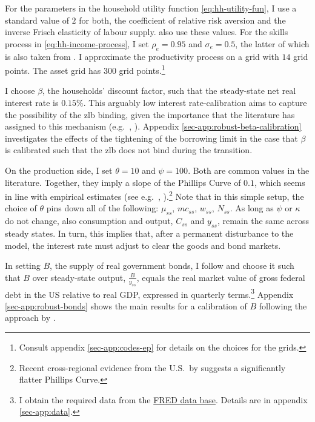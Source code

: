 \documentclass[12pt]{article} %
\numberwithin{equation}{section} %
\begin{document}
For the parameters in the household utility function \eqref{eq:hh-utility-fun}, I use a standard value of $2$ for both, the coefficient of relative risk aversion and the inverse Frisch elasticity of labour supply. \textcite{auclert2021} also use these values. For the skills process in \eqref{eq:hh-income-process}, I set $\rho_e = 0.95$ and $\sigma_e = 0.5$, the latter of which is also taken from \textcite{auclert2021}. I approximate the productivity process on a grid with $14$ grid points. The asset grid has $300$ grid points.\footnote{Consult appendix \ref{sec-app:codes-ep} for details on the choices for the grids.}

I choose $\beta$, the households' discount factor, such that the steady-state net real interest rate is $0.15\%$. This arguably low interest rate-calibration aims to capture the possibility of the \Gls{zlb} binding, given the importance that the literature has assigned to this mechanism (e.g.~\cite{egg2012}, \cite{gl2017}). Appendix \ref{sec-app:robust-beta-calibration} investigates the effects of the tightening of the borrowing limit in the case that $\beta$ is calibrated such that the \Gls{zlb} does not bind during the transition.


On the production side, I set $\theta = 10$ and $\psi = 100$. Both are common values in the literature. Together, they imply a slope of the Phillips Curve of $0.1$, which seems in line with empirical estimates (see e.g.~\cite{schorfheide2008}, \cite{bayer2023}).\footnote{Recent cross-regional evidence from the U.S.~by \textcite{hazell2022} suggests a significantly flatter Phillips Curve.} Note that in this simple setup, the choice of $\theta$ pins down all of the following: $\mu_{ss}$, $mc_{ss}$, $w_{ss}$, $N_{ss}$. As long as $\psi$ or $\kappa$ do not change, also consumption and output, $C_{ss}$ and $y_{ss}$, remain the same across steady states. In turn, this implies that, after a permanent disturbance to the model, the interest rate must adjust to clear the goods and bond markets.

In setting $B$, the supply of real government bonds, I follow \textcite{bayer2023} and choose it such that $B$ over steady-state output, $\frac{B}{y_{ss}}$, equals the real market value of gross federal debt in the US relative to real GDP, expressed in quarterly terms.\footnote{I obtain the required data from the \href{https://fred.stlouisfed.org}{FRED data base}. Details are in appendix \ref{sec-app:data}.} Appendix \ref{sec-app:robust-bonds} shows the main results for a calibration of $B$ following the approach by \textcite{mckay2016}.
\end{document}
